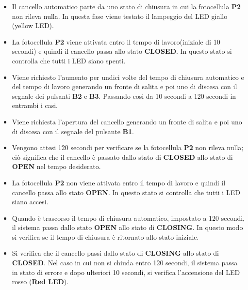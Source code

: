\documentclass[12pt]{article}
\begin{document}
\begin{itemize}
    \item Il cancello automatico parte da uno stato di chiusura in cui la fotocellula \textbf{P2} non rileva nulla. In questa fase viene testato il lampeggio del LED giallo (yellow LED).
    \item La fotocellula \textbf{P2} viene attivata entro il tempo di lavoro(iniziale di 10 secondi) e quindi il cancello passa allo stato \textbf{CLOSED}. In questo stato si controlla che tutti i LED siano spenti.
    \item Viene richiesto l'aumento per undici volte del tempo di chiusura automatico e del tempo di lavoro generando un fronte di salita e poi uno di discesa con il segnale dei pulsanti \textbf{B2} e \textbf{B3}. Passando cosi da 10 secondi a 120 secondi in entrambi i casi.
    \item Viene richiesta l’apertura del cancello generando un fronte di salita e poi uno di discesa con il segnale del pulsante \textbf{B1}.
    \item Vengono attesi 120 secondi per verificare se la fotocellula \textbf{P2} non rileva nulla; ciò significa che il cancello è passato dallo stato di \textbf{CLOSED} allo stato di \textbf{OPEN} nel tempo desiderato.
    \item La fotocellula \textbf{P2} non viene attivata entro il tempo di lavoro e quindi il cancello passa allo stato \textbf{OPEN}. In questo stato si controlla che tutti i LED siano accesi.
    \item Quando è trascorso il tempo di chiusura automatico, impostato a 120 secondi, il sistema passa dallo stato \textbf{OPEN} allo stato di \textbf{CLOSING}. In questo modo si verifica se il tempo di chiusura è ritornato allo stato iniziale.
    \item Si verifica che il cancello passi dallo stato di \textbf{CLOSING} allo stato di \textbf{CLOSED}. Nel caso in cui non si chiuda entro 120 secondi, il sistema passa in stato di errore e dopo ulteriori 10 secondi, si verifica l'accensione del LED rosso (\textbf{Red LED}).
\end{itemize}
\end{document}
